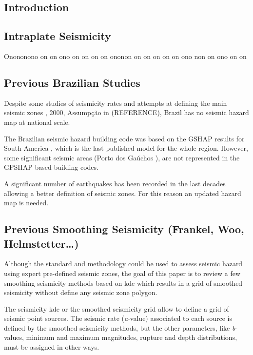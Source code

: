 \documentclass[draft, grl]{agutex}
\begin{document}
\begin{article}

\section{Introduction}

\subsection{Intraplate Seismicity}

Onononono on on ono on on on on ononon on on on on on ono non on ono on on

\subsection{Previous Brazilian Studies}

Despite some studies of seismicity rates and attempts at defining the main seismic zones \citep{berrocal_1984}, 2000, Assumpção in \citep{talwani_2014} (REFERENCE), Brazil has no seismic hazard map at national scale.

The Brazilian seismic hazard building code \citep{nbr_15421_2006} was based on the GSHAP \citep{giardini_1999} results for South America \citep{shedlock_tanner_1999}, which is the last published model for the whole region. However, some significant seismic areas (Porto dos Gaúchos \citep{barros_2009}), are not represented in the GPSHAP-based building codes.

A significant number of earthquakes has been recorded in the last decades \citep{bsb_2014} allowing a better definition of seismic zones. For this reason an updated hazard map is needed.


\subsection{Previous Smoothing Seismicity (Frankel, Woo, Helmstetter\ldots)}

Although the standard \citet{cornell_1968} and \citet{mcguire_1976} methodology could be used to assess seismic hazard using expert pre-defined seismic zones, the goal of this paper is to review a few smoothing seismicity methods based on \gls{kde} which results in a grid of smoothed seismicity without define any seismic zone polygon.

The seismicity \gls{kde} or the smoothed seismicity grid allow to define a grid of seismic point sources. The seismic rate (\emph{a}-value) associated to each source is defined by the smoothed seismicity methods, but the other parameters, like \emph{b}-values, minimum and maximum magnitudes, rupture and depth distributions, must be assigned in other ways.


\end{article}
\end{document}
